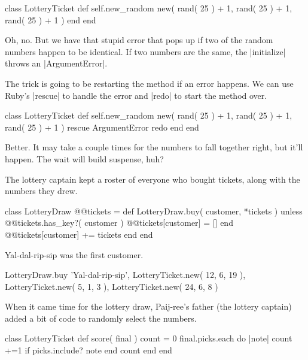 \documentclass[12pt,twoside]{report}
\begin{document}
\begin{rubycode}

 class LotteryTicket
   def self.new_random
     new( rand( 25 ) + 1, rand( 25 ) + 1, rand( 25 ) + 1 )
   end
 end

\end{rubycode}


Oh, no.  But we have that stupid error that pops up if two of the
random numbers happen to be identical.  If two numbers are the same,
the \rubyinline|initialize| throws an
\rubyinline|ArgumentError|.

The trick is going to be restarting the method if an error happens. We
can use Ruby's \rubyinline|rescue| to handle the error
and \rubyinline|redo| to start the method over.


\begin{rubycode}

 class LotteryTicket
   def self.new_random
     new( rand( 25 ) + 1, rand( 25 ) + 1, rand( 25 ) + 1 )
   rescue ArgumentError
     redo
   end
 end

\end{rubycode}


Better.  It may take a couple times for the numbers to fall together
right, but it'll happen.  The wait will build suspense, huh?

The lottery captain kept a roster of everyone who bought tickets,
along with the numbers they drew.


\begin{rubycode}

 class LotteryDraw
   @@tickets = {}
   def LotteryDraw.buy( customer, *tickets )
     unless @@tickets.has_key?( customer )
       @@tickets[customer] = []
     end
     @@tickets[customer] += tickets
   end
 end

\end{rubycode}


Yal-dal-rip-sip was the first customer.


\begin{rubycode}

 LotteryDraw.buy 'Yal-dal-rip-sip',
     LotteryTicket.new( 12, 6, 19 ),
     LotteryTicket.new( 5, 1, 3 ),
     LotteryTicket.new( 24, 6, 8 )

\end{rubycode}


When it came time for the lottery draw, Paij-ree's father (the lottery
captain) added a bit of code to randomly select the numbers.


\begin{rubycode}

 class LotteryTicket
   def score( final )
     count = 0
     final.picks.each do |note|
       count +=1 if picks.include? note
     end
     count
   end
 end

\end{rubycode}
\end{document}
